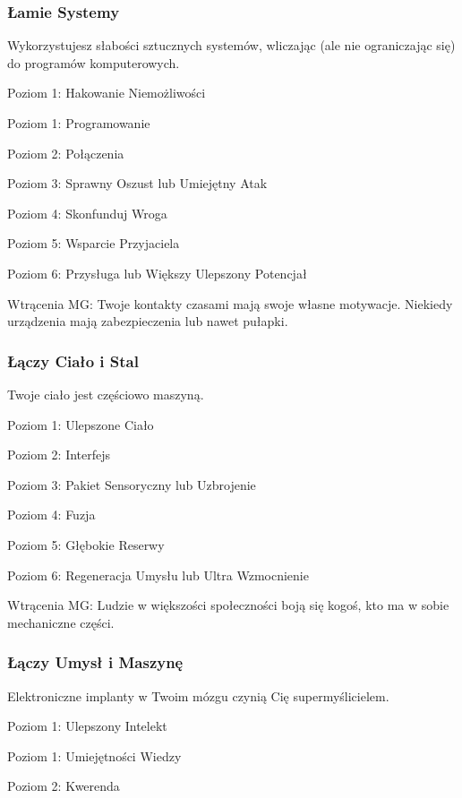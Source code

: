 \subsubsection{Łamie Systemy}

Wykorzystujesz słabości sztucznych systemów, wliczając (ale nie ograniczając się) do programów komputerowych.

Poziom 1: Hakowanie Niemożliwości

Poziom 1: Programowanie

Poziom 2: Połączenia

Poziom 3: Sprawny Oszust lub Umiejętny Atak

Poziom 4: Skonfunduj Wroga

Poziom 5: Wsparcie Przyjaciela

Poziom 6: Przysługa lub Większy Ulepszony Potencjał

Wtrącenia MG: Twoje kontakty czasami mają swoje własne motywacje. Niekiedy urządzenia mają zabezpieczenia lub nawet pułapki.

\subsubsection{Łączy Ciało i Stal}

Twoje ciało jest częściowo maszyną.

Poziom 1: Ulepszone Ciało

Poziom 2: Interfejs

Poziom 3: Pakiet Sensoryczny lub Uzbrojenie

Poziom 4: Fuzja

Poziom 5: Głębokie Reserwy

Poziom 6: Regeneracja Umysłu lub Ultra Wzmocnienie

Wtrącenia MG: Ludzie w większości społeczności boją się kogoś, kto ma w sobie mechaniczne części.

\subsubsection{Łączy Umysł i Maszynę}

Elektroniczne implanty w Twoim mózgu czynią Cię supermyślicielem.

Poziom 1: Ulepszony Intelekt

Poziom 1: Umiejętności Wiedzy

Poziom 2: Kwerenda

